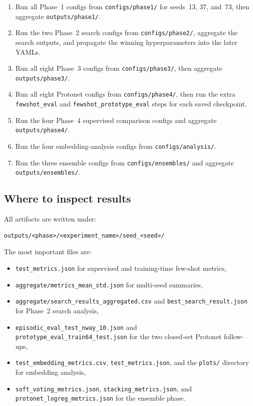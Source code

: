 \documentclass[12pt,a4paper]{article}
\begin{document}
\begin{enumerate}[nosep]
    \item Run all Phase~1 configs from \texttt{configs/phase1/} for seeds~13, 37, and~73, then aggregate \texttt{outputs/phase1/}.
    \item Run the two Phase~2 search configs from \texttt{configs/phase2/}, aggregate the search outputs, and propagate the winning hyperparameters into the later YAMLs.
    \item Run all eight Phase~3 configs from \texttt{configs/phase3/}, then aggregate \texttt{outputs/phase3/}.
    \item Run all eight Protonet configs from \texttt{configs/phase4/}, then run the extra \texttt{fewshot\_eval} and \texttt{fewshot\_prototype\_eval} steps for each saved checkpoint.
    \item Run the four Phase~4 supervised comparison configs and aggregate \texttt{outputs/phase4/}.
    \item Run the four embedding-analysis configs from \texttt{configs/analysis/}.
    \item Run the three ensemble configs from \texttt{configs/ensembles/} and aggregate \texttt{outputs/ensembles/}.
\end{enumerate}


\subsection{Where to inspect results}
\label{subsec:outputs}

All artifacts are written under:

\begin{verbatim}
outputs/<phase>/<experiment_name>/seed_<seed>/
\end{verbatim}

The most important files are:

\begin{itemize}[nosep]
    \item \texttt{test\_metrics.json} for supervised and training-time few-shot metrics,
    \item \texttt{aggregate/metrics\_mean\_std.json} for multi-seed summaries,
    \item \texttt{aggregate/search\_results\_aggregated.csv} and \texttt{best\_search\_result.json} for Phase~2 search analysis,
    \item \texttt{episodic\_eval\_test\_nway\_10.json} and \texttt{prototype\_eval\_train64\_test.json} for the two closed-set Protonet follow-ups,
    \item \texttt{test\_embedding\_metrics.csv}, \texttt{test\_metrics.json}, and the \texttt{plots/} directory for embedding analysis,
    \item \texttt{soft\_voting\_metrics.json}, \texttt{stacking\_metrics.json}, and \\ \texttt{protonet\_logreg\_metrics.json} for the ensemble phase.
\end{itemize}
\end{document}
